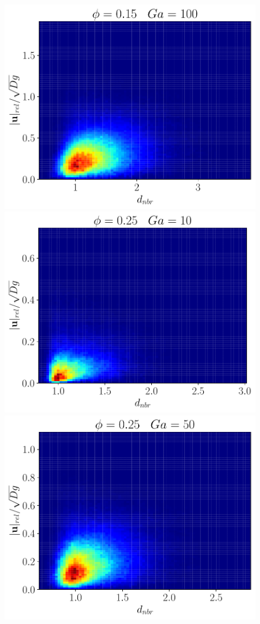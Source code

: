\begin{figure}[h!]
    \includegraphics[height = \size]{image/N_10/beta/2DMAP_distmin_v_rel_dmax_10_Bo1PHI0_15mu_r0_42Ga100.pdf}
    \includegraphics[height = \size]{image/N_10/beta/2DMAP_distmin_v_rel_dmax_10_Bo1PHI0_25mu_r0_42Ga10.pdf}
    \includegraphics[height = \size]{image/N_10/beta/2DMAP_distmin_v_rel_dmax_10_Bo1PHI0_25mu_r0_42Ga50.pdf}

\end{figure}
